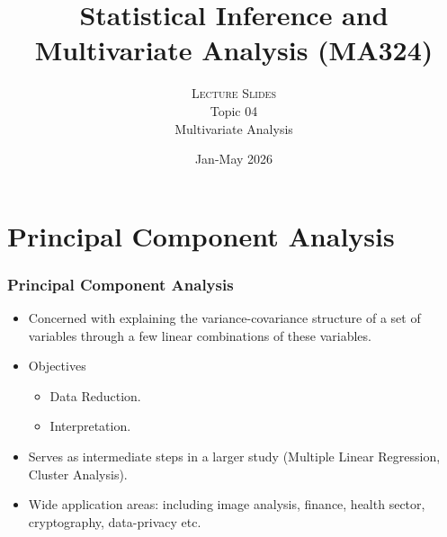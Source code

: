 \documentclass[10pt]{beamer} %
\title[]{Statistical Inference and Multivariate Analysis (MA324)}
\subtitle{\textsc{Lecture Slides}\\Topic 04\\ Multivariate Analysis}
\date{Jan-May 2026}
\begin{document}
\thispagestyle{empty}
\maketitle

\section{Principal Component Analysis}

\begin{frame}
   \frametitle{Principal Component Analysis}
   \begin{itemize}
      \item Concerned with explaining the variance-covariance structure of a set
         of variables through a few linear combinations of these variables. 
         \vspace{0.45cm}
      \item Objectives
         \vspace{0.45cm}
         \begin{itemize}
            \item Data Reduction.
               \vspace{0.25cm}
            \item Interpretation.
         \end{itemize}
         \vspace{0.45cm}
      \item Serves as intermediate steps in a larger study (Multiple Linear
         Regression, Cluster Analysis).
         \vspace{0.45cm}
      \item Wide application areas: including image analysis, finance, health
         sector, cryptography, data-privacy etc. 
   \end{itemize}
\end{frame}
\end{document}
